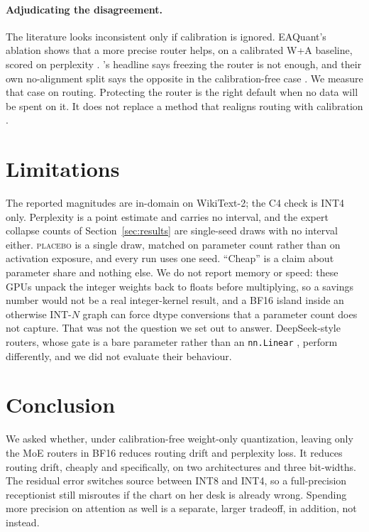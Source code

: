\documentclass[11pt]{article}
\newcommand{\placebo}{\textsc{placebo}}
\begin{document}
\paragraph{Adjudicating the disagreement.}
The literature looks inconsistent only if calibration is ignored.
EAQuant's ablation shows that a more precise router helps, on a calibrated
W+A baseline, scored on perplexity \citep{fu2025eaquant}. \citeauthor{routequant2026}'s
headline says freezing the router is not enough, and their own no-alignment
split says the opposite in the calibration-free case
\citep{routequant2026}. We measure that case on routing. Protecting the
router is the right default when no data will be spent on it. It does not
replace a method that realigns routing with calibration
\citep{park2026vsraq,hyeon2026retrainingfree,routequant2026}.

\section{Limitations}
\label{sec:limitations}

The reported magnitudes are in-domain on WikiText-2; the C4 check is
INT4 only. Perplexity is a point estimate and carries no interval, and the
expert collapse counts of Section~\ref{sec:results} are single-seed draws
with no interval either. \placebo{} is a single draw, matched on parameter
count rather than on activation exposure, and every run uses one seed.
``Cheap'' is a claim about parameter share and nothing else. We do not
report memory or speed: these GPUs unpack the integer weights back to
floats before multiplying, so a savings number would not be a real
integer-kernel result, and a BF16 island inside an otherwise INT-$N$ graph
can force dtype conversions that a parameter count does not capture. That
was not the question we set out to answer. DeepSeek-style routers, whose
gate is a bare parameter rather than an \texttt{nn.Linear}
\citep{dai2024deepseekmoe}, perform differently, and we did not evaluate
their behaviour.

\section{Conclusion}
\label{sec:conclusion}

We asked whether, under calibration-free weight-only quantization, leaving
only the MoE routers in BF16 reduces routing drift and perplexity loss.
It reduces routing drift, cheaply and specifically, on two architectures
and three bit-widths. The residual error switches source between INT8 and
INT4, so a full-precision receptionist still misroutes if the chart on
her desk is already wrong. Spending more precision on attention as well
is a separate, larger tradeoff, in addition, not instead.
\end{document}
